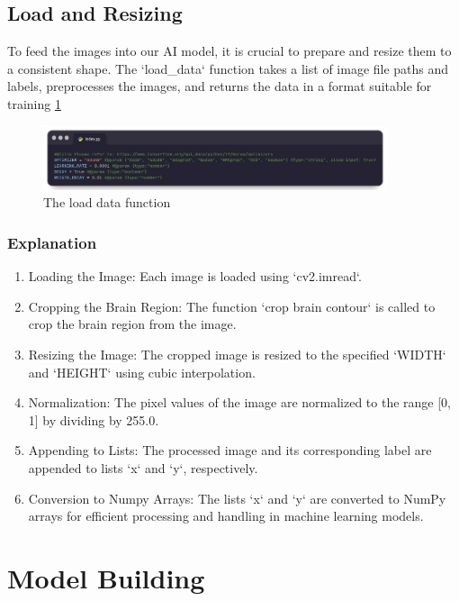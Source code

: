 \subsection{Load and Resizing}

To feed the images into our AI model, it is crucial to prepare and resize them to a consistent shape. The `load\_data` function takes a list of image file paths and labels, preprocesses the images, and returns the data in a format suitable for training \ref{fig:brain_tumor_loaddata}

 \begin{figure}
    \centering
    \includegraphics[width=0.90\textwidth]{Img/Chap-01/20.jpg}
    \caption{ The load data function}
    \label{fig:brain_tumor_loaddata}
\end{figure}

\subsubsection{Explanation}

\begin{enumerate}
    \item Loading the Image: Each image is loaded using `cv2.imread`.
    \item Cropping the Brain Region: The function `crop brain contour` is called to crop the brain region from the image. 
    \item Resizing the Image: The cropped image is resized to the specified `WIDTH` and `HEIGHT` using cubic interpolation. 
    \item Normalization: The pixel values of the image are normalized to the range [0, 1] by dividing by 255.0.
    \item Appending to Lists: The processed image and its corresponding label are appended to lists `x` and `y`, respectively. 
    \item Conversion to Numpy Arrays: The lists `x` and `y` are converted to NumPy arrays for efficient processing and handling in machine learning models.
\end{enumerate}

\section{Model Building}

